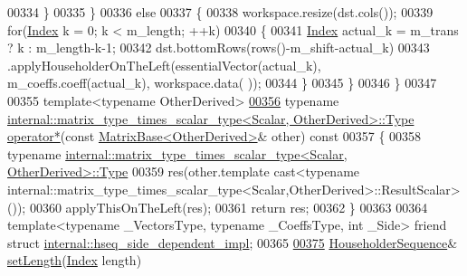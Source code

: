 \begin{DoxyCode}
00334         \}
00335       \}
00336       \textcolor{keywordflow}{else}
00337       \{
00338         workspace.resize(dst.cols());
00339         \textcolor{keywordflow}{for}(\hyperlink{group___core___module_a554f30542cc2316add4b1ea0a492ff02}{Index} k = 0; k < m\_length; ++k)
00340         \{
00341           \hyperlink{group___core___module_a554f30542cc2316add4b1ea0a492ff02}{Index} actual\_k = m\_trans ? k : m\_length-k-1;
00342           dst.bottomRows(rows()-m\_shift-actual\_k)
00343             .applyHouseholderOnTheLeft(essentialVector(actual\_k), m\_coeffs.coeff(actual\_k), workspace.data(
      ));
00344         \}
00345       \}
00346     \}
00347 
00355     \textcolor{keyword}{template}<\textcolor{keyword}{typename} OtherDerived>
\hyperlink{group___householder___module_ac57e5a22f1646e04a4f8b4cba3825928}{00356}     \textcolor{keyword}{typename} \hyperlink{group___core___module_class_eigen_1_1_matrix}{internal::matrix\_type\_times\_scalar\_type<Scalar, OtherDerived>::Type}
       \hyperlink{group___householder___module_ac57e5a22f1646e04a4f8b4cba3825928}{operator*}(\textcolor{keyword}{const} \hyperlink{group___core___module_class_eigen_1_1_matrix_base}{MatrixBase<OtherDerived>}& other)\textcolor{keyword}{ const}
00357 \textcolor{keyword}{    }\{
00358       \textcolor{keyword}{typename} 
      \hyperlink{group___core___module_class_eigen_1_1_matrix}{internal::matrix\_type\_times\_scalar\_type<Scalar, OtherDerived>::Type}
00359         res(other.template cast<\textcolor{keyword}{typename} 
      internal::matrix\_type\_times\_scalar\_type<Scalar,OtherDerived>::ResultScalar>());
00360       applyThisOnTheLeft(res);
00361       \textcolor{keywordflow}{return} res;
00362     \}
00363 
00364     \textcolor{keyword}{template}<\textcolor{keyword}{typename} \_VectorsType, \textcolor{keyword}{typename} \_CoeffsType, \textcolor{keywordtype}{int} \_S\textcolor{keywordtype}{id}e> \textcolor{keyword}{friend} \textcolor{keyword}{struct }
      \hyperlink{struct_eigen_1_1internal_1_1hseq__side__dependent__impl}{internal::hseq\_side\_dependent\_impl};
00365 
\hyperlink{group___householder___module_a30cc06d5b2ca4b7dcf5fcd53313d25fc}{00375}     \hyperlink{group___householder___module_class_eigen_1_1_householder_sequence}{HouseholderSequence}& \hyperlink{group___householder___module_a30cc06d5b2ca4b7dcf5fcd53313d25fc}{setLength}(\hyperlink{group___core___module_a554f30542cc2316add4b1ea0a492ff02}{Index} length)

\end{DoxyCode}
